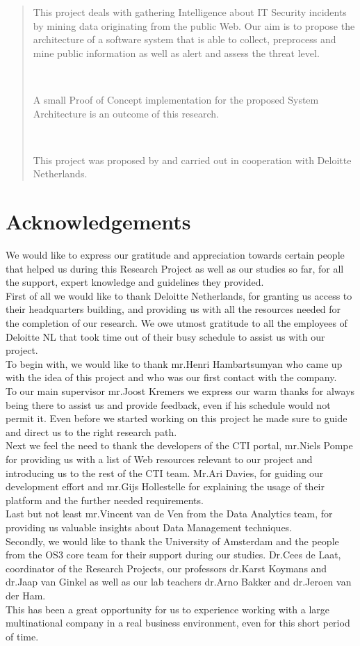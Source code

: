 \documentclass[12pt]{article}
\begin{document}
\newpage
\begin{abstract}
\noindent
\parbox{\linewidth}{
This project deals with gathering Intelligence about IT Security incidents by mining data originating from the public Web. Our aim is to propose the architecture of a software system that is able to collect, preprocess and mine public information as well as alert and assess the threat level. }
\hfill \break \\ 
\parbox{\linewidth}{
A small Proof of Concept implementation for the proposed System Architecture is an outcome of this research.
} 
\hfill \break \\ 
\parbox{\linewidth}{
This project was proposed by and carried out in cooperation with Deloitte Netherlands. }
\end{abstract}
\newpage
\section*{Acknowledgements}

We would like to express our gratitude and appreciation towards certain people that helped us during this Research Project as well as our studies so far, for all the support, expert knowledge and guidelines they provided. 
\hfill \break \\ 
First of all we would like to thank Deloitte Netherlands, for granting us access to their headquarters building, and providing us with all the resources needed for the completion of our research. We owe utmost gratitude to all the employees of Deloitte NL that took time out of their busy schedule to assist us with our project. 
\\ 
To begin with, we would like to thank mr.Henri Hambartsumyan who came up with the idea of this project and who was our first contact with the company. \\
To our main supervisor mr.Joost Kremers we express our warm thanks for always being there to assist us and provide feedback, even if his schedule would not permit it. Even before we started working on this project he made sure to guide and direct us to the right research path.\\
Next we feel the need to thank the developers of the CTI portal, mr.Niels Pompe for providing us with a list of Web resources relevant to our project and introducing us to the rest of the CTI team. Mr.Ari Davies, for guiding our development effort and mr.Gijs Hollestelle for explaining the usage of their platform and the further needed requirements.\\
Last but not least mr.Vincent van de Ven from the Data Analytics team, for providing us valuable insights about Data Management techniques. 
\hfill \break \\ 
Secondly, we would like to thank the University of Amsterdam and the people from the OS3 core team for their support during our studies. Dr.Cees de Laat, coordinator of the Research Projects, our professors dr.Karst Koymans and dr.Jaap van Ginkel as well as our lab teachers dr.Arno Bakker and dr.Jeroen van der Ham. 
\hfill \break \\ 
This has been a great opportunity for us to experience working with a large multinational company in a real business environment, even for this short period of time.
\end{document}
